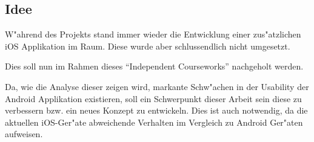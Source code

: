\subsection{Idee}

W"ahrend des Projekts stand immer wieder die Entwicklung einer zus"atzlichen iOS Applikation im Raum. 
Diese wurde aber schlussendlich nicht umgesetzt.

Dies soll nun im Rahmen dieses \enquote{Independent Courseworks} nachgeholt werden. 

Da, wie die Analyse dieser zeigen wird, markante Schw"achen in der Usability der Android Applikation existieren, soll ein Schwerpunkt dieser Arbeit sein diese zu verbessern bzw. ein neues Konzept zu entwickeln. Dies ist auch notwendig, da die aktuellen iOS-Ger"ate abweichende Verhalten im Vergleich zu Android Ger"aten aufweisen.
